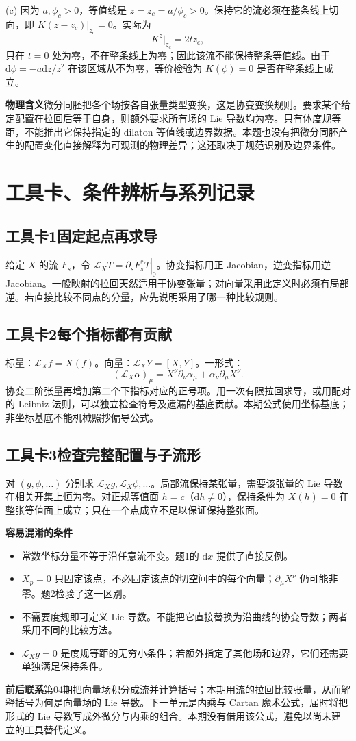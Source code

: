 \documentclass[11pt,a4paper]{article}
\newcommand{\D}{\mathrm d}\newcommand{\Lie}{\mathcal L}
\newcommand{\head}[1]{\section*{\color{teal}#1}}
\begin{document}
(c) 因为 $a,\phi_c>0$，等值线是 $z=z_c=a/\phi_c>0$。保持它的流必须在整条线上切向，即 $K(z-z_c)|_{z_c}=0$。实际为
\[
 K^z|_{z_c}=2tz_c,
\]
只在 $t=0$ 处为零，不在整条线上为零；因此该流不能保持整条等值线。由于 $\D\phi=-a\D z/z^2$ 在该区域从不为零，等价检验为 $K(\phi)=0$ 是否在整条线上成立。

\textbf{物理含义}\quad 微分同胚把各个场按各自张量类型变换，这是协变变换规则。要求某个给定配置在拉回后等于自身，则额外要求所有场的 Lie 导数均为零。只有体度规等距，不能推出它保持指定的 dilaton 等值线或边界数据。本题也没有把微分同胚产生的配置变化直接解释为可观测的物理差异；这还取决于规范识别及边界条件。
\newpage
\head{工具卡、条件辨析与系列记录}
\subsection*{工具卡1\quad 固定起点再求导}
给定 $X$ 的流 $F_s$，令 $\Lie_XT=\left.\partial_sF_s^*T\right|_0$。协变指标用正 Jacobian，逆变指标用逆 Jacobian。一般映射的拉回天然适用于协变张量；对向量采用此定义时必须有局部逆。若直接比较不同点的分量，应先说明采用了哪一种比较规则。
\subsection*{工具卡2\quad 每个指标都有贡献}
标量：$\Lie_Xf=X(f)$。向量：$\Lie_XY=[X,Y]$。一形式：
\[
 (\Lie_X\alpha)_\mu=X^\nu\partial_\nu\alpha_\mu+\alpha_\nu\partial_\mu X^\nu.
\]
协变二阶张量再增加第二个下指标对应的正号项。用一次有限拉回求导，或用配对的 Leibniz 法则，可以独立检查符号及遗漏的基底贡献。本期公式使用坐标基底；非坐标基底不能机械照抄偏导公式。
\subsection*{工具卡3\quad 检查完整配置与子流形}
对 $(g,\phi,\ldots)$ 分别求 $\Lie_Xg,\Lie_X\phi,\ldots$。局部流保持某张量，需要该张量的 Lie 导数在相关开集上恒为零。对正规等值面 $h=c$（$\D h\ne0$），保持条件为 $X(h)=0$ 在整张等值面上成立；只在一个点成立不足以保证保持整张面。

\textbf{容易混淆的条件}
\begin{itemize}
\item 常数坐标分量不等于沿任意流不变。题1的 $\D x$ 提供了直接反例。
\item $X_p=0$ 只固定该点，不必固定该点的切空间中的每个向量；$\partial_\mu X^\nu$ 仍可能非零。题2检验了这一区别。
\item 不需要度规即可定义 Lie 导数。不能把它直接替换为沿曲线的协变导数；两者采用不同的比较方法。
\item $\Lie_Xg=0$ 是度规等距的无穷小条件；若额外指定了其他场和边界，它们还需要单独满足保持条件。
\end{itemize}
\textbf{前后联系}\quad 第04期把向量场积分成流并计算括号；本期用流的拉回比较张量，从而解释括号为何是向量场的 Lie 导数。下一单元是内乘与 Cartan 魔术公式，届时将把形式的 Lie 导数写成外微分与内乘的组合。本期没有借用该公式，避免以尚未建立的工具替代定义。
\end{document}
